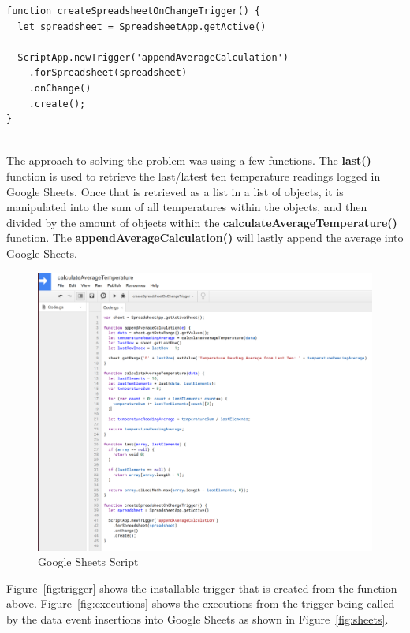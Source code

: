 \documentclass{article}
\begin{document}
\begin{minipage}[c]{\textwidth}
\begin{lstlisting}
function createSpreadsheetOnChangeTrigger() {
  let spreadsheet = SpreadsheetApp.getActive()
  
  ScriptApp.newTrigger('appendAverageCalculation')
    .forSpreadsheet(spreadsheet)
    .onChange()
    .create();
}
\end{lstlisting}
\end{minipage}\ \\

The approach to solving the problem was using a few functions. The \textbf{last()} function is used to retrieve the last/latest ten temperature readings logged in Google Sheets. Once that is retrieved as a list in a list of objects, it is manipulated into the sum of all temperatures within the objects, and then divided by the amount of objects within the \textbf{calculateAverageTemperature()} function. The \textbf{appendAverageCalculation()} will lastly append the average into Google Sheets.

\begin{figure}[H]
\center
\includegraphics[width=\textwidth]{images/particle-argon-gcp-sheets-script.png}
\caption{Google Sheets Script}
\label{fig:script}
\end{figure}

Figure~\ref{fig:trigger} shows the installable trigger that is created from the function above. Figure~\ref{fig:executions} shows the executions from the trigger being called by the data event insertions into Google Sheets as shown in Figure~\ref{fig:sheets}.\\
\end{document}
